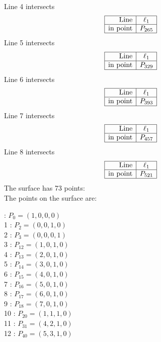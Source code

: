 \documentclass{article}
\begin{document}
{$$$$
Line 4 intersects 
$$
\begin{array}{|r*{1}{|c}|}
\hline
\mbox{Line}  & \ell_{1}\\
\hline
\mbox{in point}  & P_{265}\\
\hline
\end{array}
$$
Line 5 intersects 
$$
\begin{array}{|r*{1}{|c}|}
\hline
\mbox{Line}  & \ell_{1}\\
\hline
\mbox{in point}  & P_{329}\\
\hline
\end{array}
$$
Line 6 intersects 
$$
\begin{array}{|r*{1}{|c}|}
\hline
\mbox{Line}  & \ell_{1}\\
\hline
\mbox{in point}  & P_{393}\\
\hline
\end{array}
$$
Line 7 intersects 
$$
\begin{array}{|r*{1}{|c}|}
\hline
\mbox{Line}  & \ell_{1}\\
\hline
\mbox{in point}  & P_{457}\\
\hline
\end{array}
$$
Line 8 intersects 
$$
\begin{array}{|r*{1}{|c}|}
\hline
\mbox{Line}  & \ell_{1}\\
\hline
\mbox{in point}  & P_{521}\\
\hline
\end{array}
$$
The surface has 73 points:\\
The points on the surface are:\\
\begin{multicols}{3}
 : $P_{0}=( 1, 0, 0, 0 )$\\
1 : $P_{2}=( 0, 0, 1, 0 )$\\
2 : $P_{3}=( 0, 0, 0, 1 )$\\
3 : $P_{12}=( 1, 0, 1, 0 )$\\
4 : $P_{13}=( 2, 0, 1, 0 )$\\
5 : $P_{14}=( 3, 0, 1, 0 )$\\
6 : $P_{15}=( 4, 0, 1, 0 )$\\
7 : $P_{16}=( 5, 0, 1, 0 )$\\
8 : $P_{17}=( 6, 0, 1, 0 )$\\
9 : $P_{18}=( 7, 0, 1, 0 )$\\
10 : $P_{20}=( 1, 1, 1, 0 )$\\
11 : $P_{31}=( 4, 2, 1, 0 )$\\
12 : $P_{40}=( 5, 3, 1, 0 )$\\

\end{multicols}}
\end{document}
